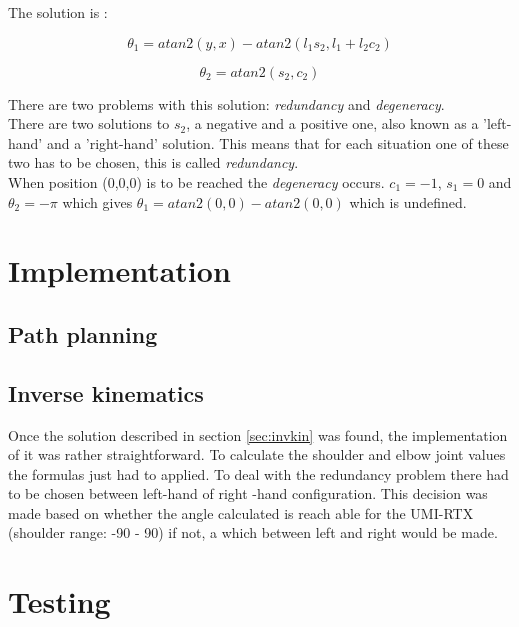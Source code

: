 \documentclass[a4paper, 11pt]{article}
\begin{document}
       The solution is :
       
       \begin{equation}
       \theta_1 =  atan2(y, x) - atan2(l_1s_2, l_1 + l_2c_2)
       \end{equation}
       
       \begin{equation}
       \theta_2 = atan2(s_2, c_2)
       \end{equation}
       
       There are two problems with this solution: \textit{redundancy} and \textit{degeneracy}. \\
       There are two solutions to $s_2$, a negative and a positive one, also known as a 'left-hand' 
       and a 'right-hand' solution. This means that for each situation one of these two has to be 
       chosen, this is called \textit{redundancy}. \\
       When position (0,0,0) is to be reached the \textit{degeneracy} occurs. $c_1 = -1$, $s_1 = 0$ 
       and $\theta_2 = - \pi$ which gives $\theta_1 = atan2(0,0) - atan2(0,0)$ which is undefined.  
        
           
\section{Implementation}

	\subsection{Path planning}
	
	\subsection{Inverse kinematics}
	Once the solution described in section \ref{sec:invkin} was found, the implementation of it was
	rather straightforward. To calculate the shoulder and elbow joint values the formulas just had to 
	applied. To deal with the redundancy problem there had to be chosen between left-hand of 
	right -hand configuration. This decision was made based on whether the angle calculated is 
	reach able for the UMI-RTX (shoulder range: -90 - 90) if not, a which between left and right 
	would be made.
	
	
\section{Testing}
\end{document}
